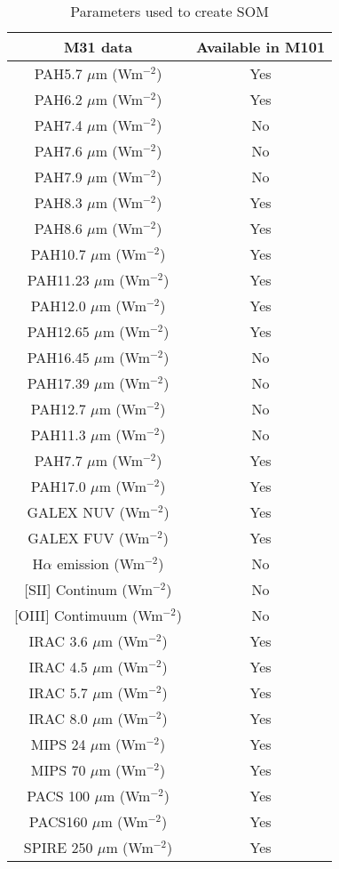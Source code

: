 \begin{table}
\centering
\caption{Parameters used to create SOM}
\label{tab: data}
\begin{tabular}{ |c|c| }
\hline\hline
M31 data           & Available in M101 \\
\hline\hline
PAH5.7 $\mu$m (Wm$^{-2}$)  & Yes \\
PAH6.2 $\mu$m (Wm$^{-2}$)  & Yes\\
PAH7.4 $\mu$m (Wm$^{-2}$)  & No \\
PAH7.6 $\mu$m (Wm$^{-2}$)  & No \\
PAH7.9 $\mu$m (Wm$^{-2}$)  & No \\
PAH8.3 $\mu$m (Wm$^{-2}$)  & Yes\\
PAH8.6 $\mu$m (Wm$^{-2}$)  & Yes\\
PAH10.7 $\mu$m (Wm$^{-2}$) & Yes\\
PAH11.23 $\mu$m (Wm$^{-2}$)& Yes\\
PAH12.0 $\mu$m (Wm$^{-2}$) & Yes\\
PAH12.65 $\mu$m (Wm$^{-2}$)& Yes\\
PAH16.45 $\mu$m (Wm$^{-2}$)& No \\
PAH17.39 $\mu$m (Wm$^{-2}$)& No \\
PAH12.7 $\mu$m (Wm$^{-2}$) & No \\
PAH11.3 $\mu$m (Wm$^{-2}$) & No \\
PAH7.7 $\mu$m (Wm$^{-2}$)  & Yes\\
PAH17.0 $\mu$m (Wm$^{-2}$) &Yes \\
GALEX NUV (Wm$^{-2}$)      & Yes\\
GALEX FUV (Wm$^{-2}$)      & Yes\\
H$\alpha$ emission (Wm$^{-2}$) & No\\
{[}SII{]} Continum (Wm$^{-2}$) & No \\
{[}OIII{]} Contimuum (Wm$^{-2}$) & No \\
IRAC 3.6 $\mu$m (Wm$^{-2}$)& Yes\\
IRAC 4.5 $\mu$m (Wm$^{-2}$)& Yes\\
IRAC 5.7 $\mu$m (Wm$^{-2}$)& Yes\\
IRAC 8.0 $\mu$m (Wm$^{-2}$)& Yes\\
MIPS 24  $\mu$m (Wm$^{-2}$)& Yes\\
MIPS 70  $\mu$m (Wm$^{-2}$)& Yes\\
PACS 100 $\mu$m (Wm$^{-2}$)& Yes\\
PACS160 $\mu$m (Wm$^{-2}$)& Yes\\
SPIRE 250 $\mu$m (Wm$^{-2}$)& Yes\\

\end{tabular}
\end{table}
